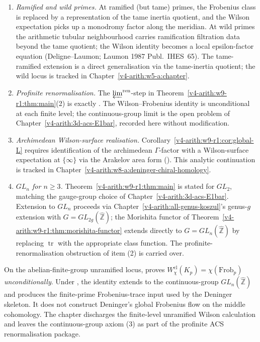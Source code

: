 \begin{enumerate}
\item \emph{Ramified and wild primes.}
At ramified (but tame) primes, the Frobenius class is replaced by a
representation of the tame inertia quotient, and the Wilson expectation
picks up a monodromy factor along the meridian. At wild primes the
arithmetic tubular neighbourhood carries ramification filtration data
beyond the tame quotient; the Wilson identity becomes a local
epsilon-factor equation (Deligne--Laumon; Laumon 1987 Publ.~IHES~65).
The tame-ramified extension is a direct generalisation via the
tame-inertia quotient; the wild locus is tracked in
Chapter~\ref{v4-arith:w5-a:chapter}.

\item \emph{Profinite renormalisation.} The
\(\varprojlim^{\mathrm{ren}}\)-step in
Theorem~\ref{v4-arith:w9-r1:thm:main}(2) is exactly
. The Wilson--Frobenius identity is
unconditional at each finite level; the continuous-group limit is the
open problem of Chapter~\ref{v4-arith:3d-acs-E1bar}, recorded here
without modification.

\item \emph{Archimedean Wilson-surface realisation.}
Corollary~\ref{v4-arith:w9-r1:cor:global-L} requires identification of
the archimedean \(\Gamma\)-factor with a Wilson-surface expectation at
\(\{\infty\}\) via the Arakelov area form
(). This analytic continuation
is tracked in Chapter~\ref{v4-arith:w8-a:deninger-chiral-homology}.

\item \emph{\(GL_{n}\) for \(n\geq 3\).}
Theorem~\ref{v4-arith:w9-r1:thm:main} is stated for \(GL_{2}\), matching
the gauge-group choice of Chapter~\ref{v4-arith:3d-acs-E1bar}. Extension
to \(GL_{n}\) proceeds via
Chapter~\ref{v4-arith:all-genus-koszul}'s genus-\(g\) extension with
\(G=GL_{2g}(\widehat{\mathbb Z})\); the Morishita functor of
Theorem~\ref{v4-arith:w9-r1:thm:morishita-functor} extends directly to
\(G=GL_{n}(\widehat{\mathbb Z})\) by replacing \(\operatorname{tr}\)
with the appropriate class function. The profinite-renormalisation
obstruction of item (2) is carried over.
\end{enumerate}

\begin{remark}
\label{v4-arith:w9-r1:rem:abelian-closed}
On the abelian-finite-group unramified locus,
 proves
\(W^{\mathrm{cl}}_{\chi}(K_{p})=\chi(\mathrm{Frob}_{p})\)
\emph{unconditionally}. Under
, the identity extends to the
continuous-group \(GL_{n}(\widehat{\mathbb Z})\) and produces the
finite-prime Frobenius-trace input used by the Deninger skeleton. It
does not construct Deninger's global Frobenius flow on the middle
cohomology. The chapter discharges the finite-level unramified Wilson
calculation and leaves the continuous-group axiom
(3) as part of the profinite ACS
renormalisation package.
\end{remark}

